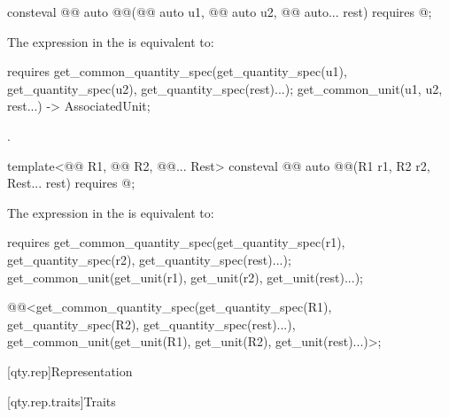 \begin{itemdecl}
consteval @@ auto @@(@@ auto u1,
                                                   @@ auto u2,
                                                   @@ auto... rest)
  requires @\seebelownc@;
\end{itemdecl}

\begin{itemdescr}
\pnum
The expression in the  is equivalent to:
\begin{codeblock}
requires {
  get_common_quantity_spec(get_quantity_spec(u1), get_quantity_spec(u2),
                           get_quantity_spec(rest)...);
  { get_common_unit(u1, u2, rest...) } -> AssociatedUnit;
}
\end{codeblock}

\pnum
\returns
{}.
\end{itemdescr}

\begin{itemdecl}
template<@@ R1, @@ R2, @@... Rest>
consteval @@ auto @@(R1 r1, R2 r2, Rest... rest)
  requires @\seebelownc@;
\end{itemdecl}

\begin{itemdescr}
\pnum
The expression in the  is equivalent to:
\begin{codeblock}
requires {
  get_common_quantity_spec(get_quantity_spec(r1), get_quantity_spec(r2),
                           get_quantity_spec(rest)...);
  get_common_unit(get_unit(r1), get_unit(r2), get_unit(rest)...);
}
\end{codeblock}

\pnum
\returns
\begin{codeblock}
@@<get_common_quantity_spec(get_quantity_spec(R1{}), get_quantity_spec(R2{}),
                                     get_quantity_spec(rest)...),
            get_common_unit(get_unit(R1{}), get_unit(R2{}), get_unit(rest)...)>{};
\end{codeblock}
\end{itemdescr}

[qty.rep]{Representation}

[qty.rep.traits]{Traits}

